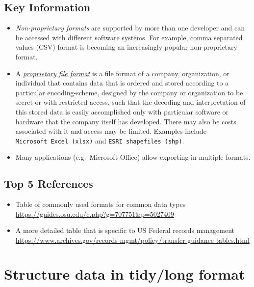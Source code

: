 \documentclass[
  oneside]{book}
\providecommand{\tightlist}{%
  \setlength{\itemsep}{0pt}\setlength{\parskip}{0pt}}
\begin{document}
\hypertarget{key-information}{%
\subsection{Key Information}\label{key-information}}

\begin{itemize}
\tightlist
\item
  \emph{Non-proprietary formats} are supported by more than one developer and can be accessed with different software systems. For example, comma separated values (CSV) format is becoming an increasingly popular non-proprietary format.
\item
  A \emph{\href{https://en.wikipedia.org/wiki/Proprietary_file_format}{proprietary file format}} is a file format of a company, organization, or individual that contains data that is ordered and stored according to a particular encoding-scheme, designed by the company or organization to be secret or with restricted access, such that the decoding and interpretation of this stored data is easily accomplished only with particular software or hardware that the company itself has developed. There may also be costs associated with it and access may be limited. Examples include \texttt{Microsoft\ Excel\ (xlsx)} and \texttt{ESRI\ shapefiles\ (shp)}.
\item
  Many applications (e.g.~Microsoft Office) allow exporting in multiple formats.
\end{itemize}

\hypertarget{top-5-references}{%
\subsection{Top 5 References}\label{top-5-references}}

\begin{itemize}
\tightlist
\item
  Table of commonly used formats for common data types\\
  \url{https://guides.osu.edu/c.php?g=707751\&p=5027409}
\item
  A more detailed table that is specific to US Federal records management\\
  \url{https://www.archives.gov/records-mgmt/policy/transfer-guidance-tables.html}
\end{itemize}

\hypertarget{structure-data-in-tidylong-format}{%
\section{Structure data in tidy/long format}\label{structure-data-in-tidylong-format}}
\end{document}
